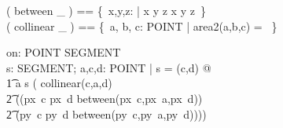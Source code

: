 \documentclass[12pt]{scrartcl}
\begin{document}
%
\begin{zed}
  ( between \_ ) == \{~x,y,z: \real | x \alt y \alt z \lor x \agt y
  \agt z~\}\\
  ( collinear \_ ) == \{~a, b, c: POINT | area2(a,b,c) = \azero~\}
\end{zed}
%
%
\begin{axdef}
  on: POINT \rel SEGMENT \\
  \where
  \forall s: SEGMENT; a,c,d: POINT | s = (c,d) @ \\
  \t1 a  s \iff ( collinear(c,a,d) \\
  \t2 \land ((px~c \neq px~d \land between(px~c,px~a,px~d)) \\
  \t2 \lor (py~c \neq py~d \land between(py~c,py~a,py~d))))
\end{axdef}
%
  
  
  

%
\printbibliography{}

\end{document}
